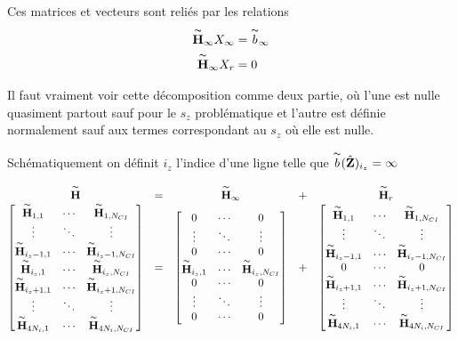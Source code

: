 Ces matrices et vecteurs sont reliés par les relations
\begin{align}
  \overset{\thicksim}{\mathbf{H}}_\infty X_\infty &= \overset{\thicksim}{b}_\infty
  \\
  \overset{\thicksim}{\mathbf{H}}_\infty X_r &= 0
\end{align}

Il faut vraiment voir cette décomposition comme deux partie, où l'une est nulle quasiment partout sauf pour le \(s_z\) problématique et l'autre est définie normalement sauf aux termes correspondant au \(s_z\) où elle est nulle.

Schématiquement on définit \(i_z\) l'indice d'une ligne telle que \(\overset{\thicksim}{b}(\hat{\mathbf{Z}})_{i_z} = \infty\)

\begin{equation*}
  \begin{matrix}
    \overset{\thicksim}{\mathbf{H}} &=& \overset{\thicksim}{\mathbf{H}}_\infty &+& \overset{\thicksim}{\mathbf{H}}_r
    \\
    \begin{bmatrix}
      \overset{\thicksim}{\mathbf{H}}_{1,1} & \cdots & \overset{\thicksim}{\mathbf{H}}_{1,N_{CI}}
      \\
      \vdots & \ddots & \vdots
      \\
      \overset{\thicksim}{\mathbf{H}}_{i_z-1,1} & \cdots & \overset{\thicksim}{\mathbf{H}}_{i_z-1,N_{CI}}
      \\
      \overset{\thicksim}{\mathbf{H}}_{i_z,1} & \cdots & \overset{\thicksim}{\mathbf{H}}_{i_z,N_{CI}}
      \\
      \overset{\thicksim}{\mathbf{H}}_{i_z+1,1} & \cdots & \overset{\thicksim}{\mathbf{H}}_{i_z+1,N_{CI}}
      \\
      \vdots & \ddots & \vdots
      \\
      \overset{\thicksim}{\mathbf{H}}_{4N_i,1} & \cdots & \overset{\thicksim}{\mathbf{H}}_{4N_i,N_{CI}}
    \end{bmatrix}
    & = &
    \begin{bmatrix}
      0 & \cdots & 0
      \\
      \vdots & \ddots & \vdots
      \\
      0 & \cdots & 0
      \\
      \overset{\thicksim}{\mathbf{H}}_{i_z,1} & \cdots & \overset{\thicksim}{\mathbf{H}}_{i_z,N_{CI}}
      \\
      0 & \cdots & 0
      \\
      \vdots & \ddots & \vdots
      \\
      0 & \cdots & 0
    \end{bmatrix}
    & + & 
    \begin{bmatrix}
      \overset{\thicksim}{\mathbf{H}}_{1,1} & \cdots & \overset{\thicksim}{\mathbf{H}}_{1,N_{CI}}
      \\
      \vdots & \ddots & \vdots
      \\
      \overset{\thicksim}{\mathbf{H}}_{i_z-1,1} & \cdots & \overset{\thicksim}{\mathbf{H}}_{i_z-1,N_{CI}}
      \\
      0 & \cdots & 0
      \\
      \overset{\thicksim}{\mathbf{H}}_{i_z+1,1} & \cdots & \overset{\thicksim}{\mathbf{H}}_{i_z+1,N_{CI}}
      \\
      \vdots & \ddots & \vdots
      \\
      \overset{\thicksim}{\mathbf{H}}_{4N_i,1} & \cdots & \overset{\thicksim}{\mathbf{H}}_{4N_i,N_{CI}}
    \end{bmatrix}
  \end{matrix}
\end{equation*}
